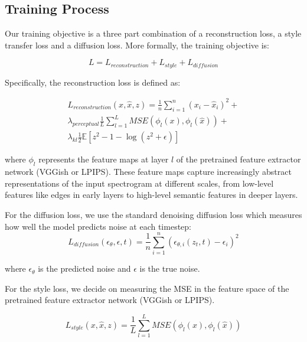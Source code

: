 \subsection{Training Process}

Our training objective is a three part combination of a reconstruction loss, a style transfer loss and a diffusion loss. More formally, the training objective is:

\begin{equation}
    L = L_{reconstruction} + L_{style} + L_{diffusion}
\end{equation}

\noindent Specifically, the reconstruction loss is defined as:

\begin{equation}
    \begin{split}
    L_{reconstruction}(x, \hat{x}, z) = \frac{1}{n}\sum_{i=1}^{n}(x_i - \hat{x}_i)^2 + \\
    \lambda_{perceptual} \frac{1}{L}\sum_{l=1}^{L} MSE(\phi_l(x), \phi_l(\hat{x})) + \\
    \lambda_{kl} \frac{1}{2}\mathbb{E}[z^2 - 1 - \log(z^2 + \epsilon)]
    \end{split}
\end{equation}

\noindent where $\phi_l$ represents the feature maps at layer $l$ of the pretrained feature extractor network (VGGish or LPIPS). These feature maps capture increasingly abstract representations of the input spectrogram at different scales, from low-level features like edges in early layers to high-level semantic features in deeper layers.

\vspace{1em}

\noindent For the diffusion loss, we use the standard denoising diffusion loss which measures how well the model predicts noise at each timestep:
\begin{equation}
L_{diffusion}(\epsilon_\theta, \epsilon, t) = \frac{1}{n}\sum_{i=1}^{n}(\epsilon_{\theta,i}(z_t, t) - \epsilon_i)^2
\end{equation}

\noindent where $\epsilon_\theta$ is the predicted noise and $\epsilon$ is the true noise.

\vspace{1em}

\noindent For the style loss, we decide on measuring the MSE in the feature space of the pretrained feature extractor network (VGGish or LPIPS).

\begin{equation}
    L_{style}(x, \hat{x}, z) = 
    \frac{1}{L}\sum_{l=1}^{L} MSE(\phi_l(x), \phi_l(\hat{x}))
\end{equation}



